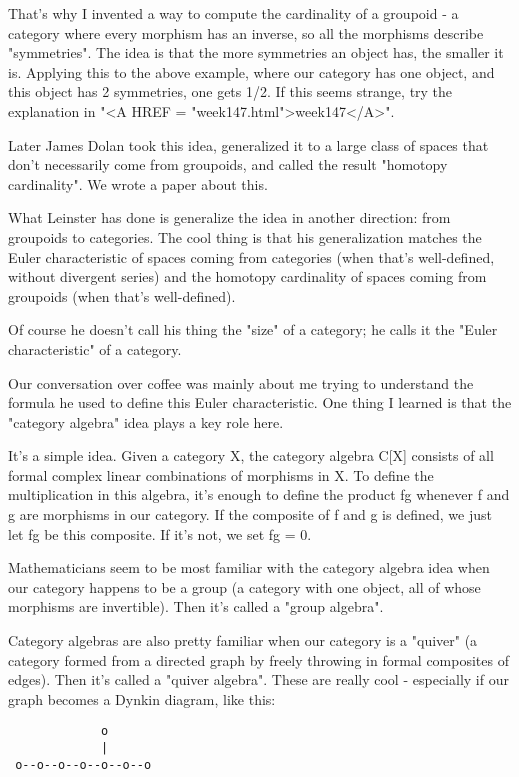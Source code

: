 That's why I invented a way to compute the cardinality of a groupoid -
a category where every morphism has an inverse, so all the morphisms
describe "symmetries".  The idea is that the more symmetries
an object has, the smaller it is.  Applying this to the above example,
where our category has one object, and this object has 2 symmetries,
one gets 1/2.  If this seems strange, try the explanation in "<A
HREF = "week147.html">week147</A>".

Later James Dolan took this idea, generalized it to a large class 
of spaces that don't necessarily come from groupoids, and called the
result "homotopy cardinality".  We wrote a paper about this.

What Leinster has done is generalize the idea in another direction: from 
groupoids to categories.  The cool thing is that his generalization 
matches the Euler characteristic of spaces coming from categories 
(when that's well-defined, without divergent series) and the homotopy 
cardinality of spaces coming from groupoids (when that's well-defined).

Of course he doesn't call his thing the "size" of a
category; he calls it the "Euler characteristic" of a
category.

Our conversation over coffee was mainly about me trying to understand
the formula he used to define this Euler characteristic.  One thing I
learned is that the "category algebra" idea plays a key role
here.

It's a simple idea.  Given a category X, the category algebra C[X]
consists of all formal complex linear combinations of morphisms in X.
To define the multiplication in this algebra, it's enough to define
the product fg whenever f and g are morphisms in our category.  If 
the composite of f and g is defined, we just let fg be this composite.
If it's not, we set fg = 0.  

Mathematicians seem to be most familiar with the category algebra idea 
when our category happens to be a group (a category with one object, all 
of whose morphisms are invertible).  Then it's called a "group 
algebra".

Category algebras are also pretty familiar when our category is a
"quiver" (a category formed from a directed graph by freely
throwing in formal composites of edges).  Then it's called a
"quiver algebra".  These are really cool - especially if our
graph becomes a Dynkin diagram, like this:

\begin{verbatim}
             o
             |
 o--o--o--o--o--o--o
\end{verbatim}
    
